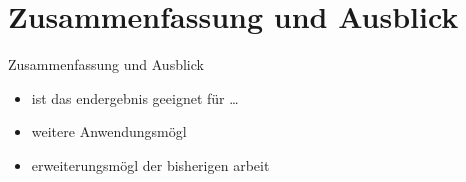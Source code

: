 \section[\thesection \  Zusammenfassung und Ausblick]{ Zusammenfassung und Ausblick}\label{sec:conclusion}

\begin{frame}{ Zusammenfassung und Ausblick}

    \begin{itemize}
        \item ist das endergebnis geeignet für \dots
        \item weitere Anwendungsmögl
        \item erweiterungsmögl der bisherigen arbeit
    \end{itemize}

\end{frame}